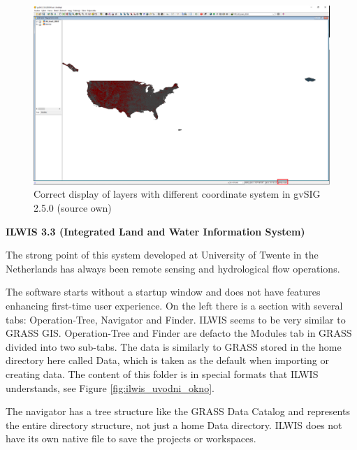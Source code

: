 \documentclass[a4paper,10pt,twoside]{article}
\begin{document}
\vspace{0.3cm}
\begin{figure}[hbt!] 
\begin{center}
\includegraphics[width=15cm]{../pictures/gvSIG_coords.PNG} 
\caption[Correct display of layers with different coordinate system in gvSIG 2.5.0 (source own)]{Correct display of layers with different coordinate system in gvSIG 2.5.0 (source own)}
\label{fig:gvSIG_coords}
\end{center}
\end{figure}

\bigskip

\noindent \textbf {ILWIS 3.3 (Integrated Land and Water Information System)}

\noindent The strong point of this system developed at University of Twente in the Netherlands has always been remote sensing and hydrological flow operations.

The software starts without a startup window and does not have features enhancing first-time user experience. On the left there is a section with several tabs: Operation-Tree, Navigator and Finder. ILWIS seems to be very similar to GRASS GIS. Operation-Tree and Finder are defacto the Modules tab in GRASS divided into two sub-tabs.  The data is similarly to GRASS stored in the home directory here called Data, which is taken as the default when importing or creating data. The content of this folder is in special formats that ILWIS understands, see Figure \ref{fig:ilwis_uvodni_okno}. 

The navigator has a tree structure like the GRASS Data Catalog and represents the entire directory structure, not just a home Data directory. ILWIS does not have its own native file to save the projects or workspaces.
\end{document}

